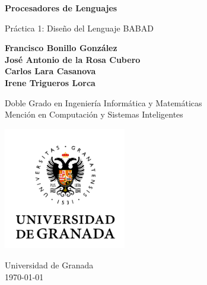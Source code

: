 \begin{titlepage}
   \begin{center}
       \vspace*{1cm}

       {\LARGE\textbf{Procesadores de Lenguajes}}

       \vspace{0.5cm}
        {\Large Práctica 1: Diseño del Lenguaje BABAD}

       \vspace{1.5cm}

       \textbf{
           Francisco Bonillo González\\
           José Antonio de la Rosa Cubero\\
           Carlos Lara Casanova\\
           Irene Trigueros Lorca
       }

       \vfill

       Doble Grado en Ingeniería Informática y Matemáticas\\
       Mención en Computación y Sistemas Inteligentes

       \vspace{0.8cm}

       \includegraphics[width=0.4\textwidth]{university.png}

       Universidad de Granada\\
           \today{}\\

   \end{center}
\end{titlepage}
